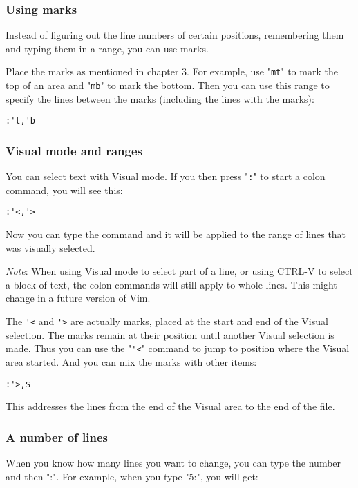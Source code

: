 \subsubsection{Using marks}
Instead of figuring out the line numbers of certain positions, remembering them and typing them in a range, you can use marks.

Place the marks as mentioned in chapter 3.
For example, use "\verb!mt!" to mark the top of an area and "\verb!mb!" to mark the bottom.
Then you can use this range to specify the lines between the marks (including the lines with the marks):

\begin{Verbatim}[samepage=true]
 :'t,'b
\end{Verbatim}
\subsubsection{Visual mode and ranges}
You can select text with Visual mode.
If you then press "\verb!:!" to start a colon command, you will see this:

\begin{Verbatim}[samepage=true]
 :'<,'>
\end{Verbatim}

Now you can type the command and it will be applied to the range of lines that was visually selected.

\emph{Note}:
When using Visual mode to select part of a line, or using CTRL-V to select a block of text, the colon commands will still apply to whole lines.
This might change in a future version of Vim.

The \verb!'<! and \verb!'>! are actually marks, placed at the start and end of the Visual selection.
The marks remain at their position until another Visual selection is made.
Thus you can use the "\verb!'<!" command to jump to position where the Visual area started.
And you can mix the marks with other items:

\begin{Verbatim}[samepage=true]
 :'>,$
\end{Verbatim}

This addresses the lines from the end of the Visual area to the end of the file.
\subsubsection{A number of lines}
When you know how many lines you want to change, you can type the number and then ":".
For example, when you type "5:", you will get:

